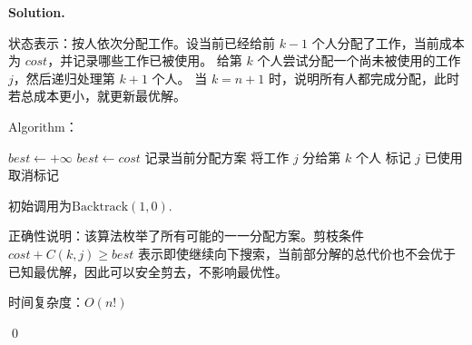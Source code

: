 \documentclass[11pt]{article}
\newenvironment{solution}{
\par\noindent\textbf{Solution.}\par\noindent
}{\qed}
\begin{document}
\begin{solution}
状态表示：按人依次分配工作。设当前已经给前 $k-1$ 个人分配了工作，当前成本为 $cost$，并记录哪些工作已被使用。
给第 $k$ 个人尝试分配一个尚未被使用的工作 $j$，然后递归处理第 $k+1$ 个人。  
当 $k=n+1$ 时，说明所有人都完成分配，此时若总成本更小，就更新最优解。

Algorithm：
\begin{algorithmic}[1]
\State $best \gets +\infty$
            \State $best\gets cost$
            \State 记录当前分配方案
        \EndIf
        \State \Return
    \EndIf
            \State 将工作 $j$ 分给第 $k$ 个人
            \State 标记 $j$ 已使用
            \State {}
            \State 取消标记
        \EndIf
    \EndFor
\EndProcedure
\end{algorithmic}

初始调用为$\text{Backtrack}(1,0).$

正确性说明：该算法枚举了所有可能的一一分配方案。剪枝条件$cost+C(k,j)\ge best$ 表示即使继续向下搜索，当前部分解的总代价也不会优于已知最优解，因此可以安全剪去，不影响最优性。

时间复杂度：$O(n!)$

\end{solution}
\end{document}
